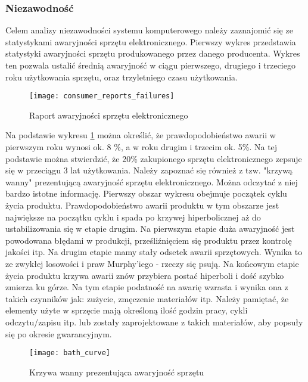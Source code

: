 			\subsubsection{Niezawodność}
					\par Celem analizy niezawodności systemu komputerowego należy zaznajomić się ze statystykami awaryjności sprzętu elektronicznego. Pierwszy wykres przedstawia statystyki awaryjności sprzętu produkowanego przez danego producenta. Wykres ten pozwala ustalić średnią awaryjność w ciągu pierwszego, drugiego i trzeciego roku użytkowania sprzętu, oraz trzyletniego czasu użytkowania. 
				
					\begin{figure}[H]
						\centering
						\texttt{[image: consumer\_reports\_failures]}
						\caption{Raport awaryjności sprzętu elektronicznego}
						\label{rep_fail}
					\end{figure}
				
				\par Na podstawie wykresu \ref{rep_fail} można określić, że prawdopodobieństwo awarii w pierwszym roku wynosi ok. 8 \%, a w roku drugim i trzecim ok. 5\%. Na tej podstawie można stwierdzić, że 20\% zakupionego sprzętu elektronicznego zepsuje się w przeciągu 3 lat użytkowania. Należy zapoznać się również z tzw. "krzywą wanny" prezentującą awaryjność sprzętu elektronicznego. Można odczytać z niej bardzo istotne informację. Pierwszy obszar wykresu obejmuje początek cyklu życia produktu. Prawdopodobieństwo awarii produktu w tym obszarze jest największe na początku cyklu i spada po krzywej hiperbolicznej aż do ustabilizowania się w etapie drugim. Na pierwszym etapie duża awaryjność jest powodowana błędami w produkcji, prześliźnięciem się produktu przez kontrolę jakości itp. Na drugim etapie mamy stały odsetek awarii sprzętowych. Wynika to ze zwykłej losowości i praw Murphy'iego - rzeczy się psują. Na końcowym etapie życia produktu krzywa awarii znów przybiera postać hiperboli i dość szybko zmierza ku górze. Na tym etapie podatność na awarię wzrasta i wynika ona z takich czynników jak: zużycie, zmęczenie materiałów itp. Należy pamiętać, że elementy użyte w sprzęcie mają określoną ilość godzin pracy, cykli odczytu/zapisu itp. lub zostały zaprojektowane z takich materiałów, aby popsuły się po okresie gwarancyjnym. 
				
				\begin{figure}[H]
					\centering
					\texttt{[image: bath\_curve]}
					\caption{Krzywa wanny prezentująca awaryjność sprzętu}
				\end{figure}

